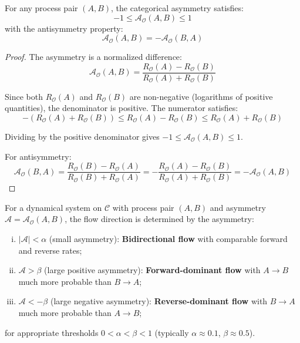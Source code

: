\begin{proposition}
\label{prop:asymmetry_bounds_formal}
For any process pair $(A, B)$, the categorical asymmetry satisfies:
\begin{equation}
-1 \leq \mathcal{A}_{\mathcal{O}}(A, B) \leq 1
\label{eq:asymmetry_bounds}
\end{equation}
with the antisymmetry property:
\begin{equation}
\mathcal{A}_{\mathcal{O}}(A, B) = -\mathcal{A}_{\mathcal{O}}(B, A)
\label{eq:asymmetry_antisymmetry}
\end{equation}
\end{proposition}

\begin{proof}
The asymmetry is a normalized difference:
\begin{equation}
\mathcal{A}_{\mathcal{O}}(A, B) = \frac{R_{\mathcal{O}}(A) - R_{\mathcal{O}}(B)}{R_{\mathcal{O}}(A) + R_{\mathcal{O}}(B)}
\end{equation}

Since both $R_{\mathcal{O}}(A)$ and $R_{\mathcal{O}}(B)$ are non-negative (logarithms of positive quantities), the denominator is positive. The numerator satisfies:
\begin{equation}
-(R_{\mathcal{O}}(A) + R_{\mathcal{O}}(B)) \leq R_{\mathcal{O}}(A) - R_{\mathcal{O}}(B) \leq R_{\mathcal{O}}(A) + R_{\mathcal{O}}(B)
\end{equation}

Dividing by the positive denominator gives $-1 \leq \mathcal{A}_{\mathcal{O}}(A, B) \leq 1$.

For antisymmetry:
\begin{equation}
\mathcal{A}_{\mathcal{O}}(B, A) = \frac{R_{\mathcal{O}}(B) - R_{\mathcal{O}}(A)}{R_{\mathcal{O}}(B) + R_{\mathcal{O}}(A)} = -\frac{R_{\mathcal{O}}(A) - R_{\mathcal{O}}(B)}{R_{\mathcal{O}}(A) + R_{\mathcal{O}}(B)} = -\mathcal{A}_{\mathcal{O}}(A, B)
\end{equation}
\end{proof}

\begin{theorem}
\label{thm:asymmetry_flow_formal}
For a dynamical system on $\mathcal{C}$ with process pair $(A, B)$ and asymmetry $\mathcal{A} = \mathcal{A}_{\mathcal{O}}(A, B)$, the flow direction is determined by the asymmetry:
\begin{enumerate}[(i)]
    \item $|\mathcal{A}| < \alpha$ (small asymmetry): \textbf{Bidirectional flow} with comparable forward and reverse rates;
    
    \item $\mathcal{A} > \beta$ (large positive asymmetry): \textbf{Forward-dominant flow} with $A \to B$ much more probable than $B \to A$;
    
    \item $\mathcal{A} < -\beta$ (large negative asymmetry): \textbf{Reverse-dominant flow} with $B \to A$ much more probable than $A \to B$;
\end{enumerate}
for appropriate thresholds $0 < \alpha < \beta < 1$ (typically $\alpha \approx 0.1$, $\beta \approx 0.5$).
\end{theorem}

